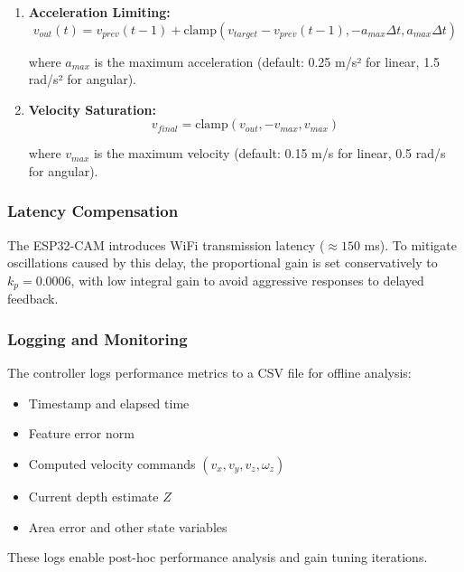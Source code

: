 \begin{enumerate}
    \item \textbf{Acceleration Limiting:}
    \begin{equation}
        v_{out}(t) = v_{prev}(t-1) + \text{clamp}\left( v_{target} - v_{prev}(t-1), -a_{max} \Delta t, a_{max} \Delta t \right)
    \end{equation}
    
    where $a_{max}$ is the maximum acceleration (default: 0.25 m/s² for linear, 1.5 rad/s² for angular).
    
    \item \textbf{Velocity Saturation:}
    \begin{equation}
        v_{final} = \text{clamp}(v_{out}, -v_{max}, v_{max})
    \end{equation}
    
    where $v_{max}$ is the maximum velocity (default: 0.15 m/s for linear, 0.5 rad/s for angular).
\end{enumerate}

\subsubsection{Latency Compensation}
The ESP32-CAM introduces WiFi transmission latency ($\approx 150$ ms). To mitigate oscillations caused by this delay, the proportional gain is set conservatively to $k_p = 0.0006$, with low integral gain to avoid aggressive responses to delayed feedback.

\subsubsection{Logging and Monitoring}
The controller logs performance metrics to a CSV file for offline analysis:
\begin{itemize}
    \item Timestamp and elapsed time
    \item Feature error norm
    \item Computed velocity commands $(v_x, v_y, v_z, \omega_z)$
    \item Current depth estimate $Z$
    \item Area error and other state variables
\end{itemize}

These logs enable post-hoc performance analysis and gain tuning iterations.
